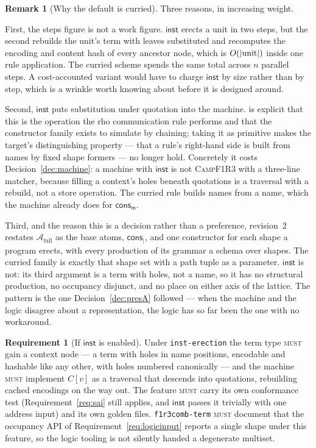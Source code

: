 \documentclass[11pt,a4paper]{article}
\newcommand{\code}[1]{\texttt{#1}}
\newcommand{\Camp}{\textsc{CampF1R3}}
\newcommand{\MUST}{\textsc{must}}
\newcommand{\mm}{\mathsf{m}}
\newcommand{\cons}{\mathsf{cons}}
\newcommand{\Atm}{\mathcal{A}}
\newcommand{\inst}{\mathsf{inst}}
\theoremstyle{definition}
\newtheorem{requirement}[definition]{Requirement}
\newtheorem{remark}[definition]{Remark}
\theoremstyle{plain}
\begin{document}
\begin{remark}[Why the default is curried]\label{rem:whycurried}
Three reasons, in increasing weight.

First, the steps figure is not a work figure. $\inst$ erects a unit in two
steps, but the second rebuilds the unit's term with leaves substituted and
recomputes the encoding and content hash of every ancestor node, which is
$O(|{\rm unit}|)$ inside one rule application. The curried scheme spends the
same total across $n$ parallel steps. A cost-accounted variant would have to
charge $\inst$ by size rather than by step, which is a wrinkle worth knowing
about before it is designed around.

Second, $\inst$ puts substitution under quotation into the machine.
\cite[\S3.6]{draft3} is explicit that this is the operation the rho
communication rule performs and that the constructor family exists to simulate
by chaining; taking it as primitive makes the target's distinguishing property
--- that a rule's right-hand side is built from names by fixed shape formers
--- no longer hold. Concretely it costs
Decision~\ref{dec:machine}: a machine with $\inst$ is not \Camp{} with a
three-line matcher, because filling a context's holes beneath quotations is a
traversal with a rebuild, not a store operation. The curried rule builds names
from a name, which the machine already does for $\cons_{\mm}$.

Third, and the reason this is a decision rather than a preference,
\cite{logic} revision~2 restates $\Atm_{\mathrm{full}}$ as the base atoms,
$\cons_{\mid}$, and one constructor for each shape a program erects, with
every production of its grammar a schema over shapes. The curried family is
exactly that shape set with a path tuple as a parameter. $\inst$ is not: its
third argument is a term with holes, not a name, so it has no structural
production, no occupancy disjunct, and no place on either axis of the lattice.
The pattern is the one Decision~\ref{dec:presA} followed --- when the machine
and the logic disagree about a representation, the logic has so far been the
one with no workaround.
\end{remark}

\begin{requirement}[If $\inst$ is enabled]\label{req:instfeature}
Under \code{inst-erection} the term type \MUST{} gain a context node --- a
term with holes in name positions, encodable and hashable like any other, with
holes numbered canonically --- and the machine \MUST{} implement $C[v]$ as a
traversal that descends into quotations, rebuilding cached encodings on the
way out. The feature \MUST{} carry its own conformance test
(Requirement~\ref{req:sai} still applies, and $\inst$ passes it trivially with
one address input) and its own golden files. \code{f1r3comb-term} \MUST{}
document that the occupancy API of Requirement~\ref{req:logicinput} reports a
single shape under this feature, so the logic tooling is not silently handed a
degenerate multiset.
\end{requirement}
\end{document}
